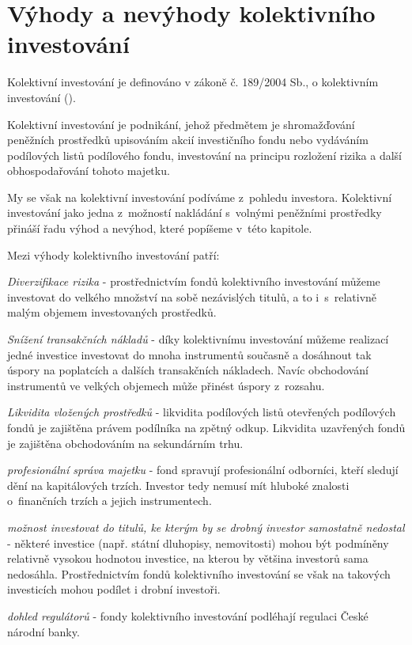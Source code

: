 \documentclass[12pt,a4paper]{article}
\begin{document}
\section{Výhody a nevýhody kolektivního investování}

Kolektivní investování je definováno v zákoně č. 189/2004 Sb., o kolektivním investování (\cite{zakon}).

Kolektivní investování je podnikání, jehož předmětem je
shromažďování peněžních prostředků upisováním akcií investičního fondu nebo vydáváním
podílových listů podílového fondu, investování na principu rozložení rizika a další
obhospodařování tohoto majetku.

My se však na kolektivní investování podíváme z~pohledu investora. Kolektivní investování jako jedna z~možností nakládání s~volnými peněžními prostředky přináší řadu výhod a nevýhod, které popíšeme v~této kapitole. 

\medskip

\noindent Mezi výhody kolektivního investování patří:
\begin{compactitem}
\item \emph{Diverzifikace rizika} - prostřednictvím fondů kolektivního investování můžeme investovat do velkého množství na sobě nezávislých titulů, a to i~s~relativně malým objemem investovaných prostředků. 

\item \emph{Snížení transakčních nákladů} - díky kolektivnímu investování můžeme realizací jedné investice investovat do mnoha instrumentů současně a dosáhnout tak úspory na poplatcích a dalších transakčních nákladech. Navíc obchodování instrumentů ve velkých objemech může přinést úspory z~rozsahu.
\item \emph{Likvidita vložených prostředků} - likvidita podílových listů otevřených podílových fondů je zajištěna právem podílníka na zpětný odkup. Likvidita uzavřených fondů je zajištěna obchodováním na sekundárním trhu.
\item \emph{profesionální správa majetku} - fond spravují profesionální odborníci, kteří sledují dění na kapitálových trzích. Investor tedy nemusí mít hluboké znalosti o~finančních trzích a jejich instrumentech. 
\item \emph{možnost investovat do titulů, ke kterým by se drobný investor samostatně nedostal} - některé investice (např. státní dluhopisy, nemovitosti) mohou být podmíněny relativně vysokou hodnotou investice, na kterou by většina investorů sama nedosáhla. Prostřednictvím fondů kolektivního investování se však na takových investicích mohou podílet i drobní investoři.
\item \emph{dohled regulátorů} - fondy kolektivního investování podléhají regulaci České národní banky.
\end{compactitem}
\end{document}

